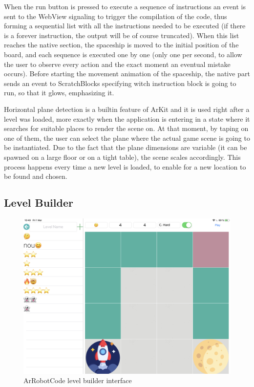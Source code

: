 \documentclass[12 pct]{report}
\begin{document}
When the run button is pressed to execute a sequence of instructions an event is sent to the WebView signaling to trigger the compilation of the code, thus forming a sequential list with all the instructions needed to be executed (if there is a forever instruction, the output will be of course truncated). When this list reaches the native section, the spaceship is moved to the initial position of the board, and each sequence is executed one by one (only one per second, to allow the user to observe every action and the exact moment an eventual mistake occurs). Before starting the movement animation of the spaceship, the native part sends an event to ScratchBlocks specifying witch instruction block is going to run, so that it glows, emphasizing it.

Horizontal plane detection is a builtin feature of ArKit and it is used right after a level was loaded, more exactly when the application is entering in a state where it searches for suitable places to render the scene on. At that moment, by taping on one of them, the user can select the plane where the actual game scene is going to be instantiated. Due to the fact that the plane dimensions are variable (it can be spawned on a large floor or on a tight table), the scene scales accordingly. This process happens every time a new level is loaded, to enable for a new location to be found and chosen.

\subsection*{Level Builder}

\begin{figure}[H]
\includegraphics[width=1.0\textwidth]{ArRobotCode3}
\centering
\caption{ArRobotCode level builder interface}
\label{fig:buildinglvl}
\end{figure}
\end{document}
